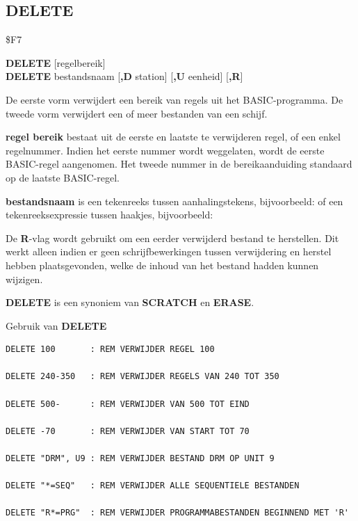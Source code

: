 \subsection{DELETE}
\begin{description}[leftmargin=2cm,style=nextline]
\item [Token:]   \$F7

\item [Formaat:]  {\bf DELETE} [regelbereik] \\                 {\bf DELETE} bestandsnaam [{\bf,D} station] [{\bf,U} eenheid] [{\bf,R}]

\item [Gebruik:]   De eerste vorm verwijdert een bereik van regels uit het BASIC-programma. De tweede vorm verwijdert een of meer bestanden van een schijf.

                 {\bf regel bereik} bestaat uit de eerste en laatste te verwijderen regel, of een enkel regelnummer. Indien het eerste nummer wordt weggelaten, wordt de eerste BASIC-regel aangenomen. Het tweede nummer in de bereikaanduiding standaard op de laatste BASIC-regel.

                 {\bf bestandsnaam} is een tekenreeks tussen aanhalingstekens, bijvoorbeeld:  of een tekenreeksexpressie tussen haakjes, bijvoorbeeld: 

                 \drivedefinition

                 \unitdefinition

                 De {\bf R}-vlag wordt gebruikt om een eerder verwijderd bestand te herstellen. Dit werkt alleen indien er geen schrijfbewerkingen tussen verwijdering en herstel hebben plaatsgevonden, welke de inhoud van het bestand hadden kunnen wijzigen.

\item [Opmerkingen:] {\bf DELETE} is een synoniem van {\bf SCRATCH} en {\bf ERASE}.

\item [Voorbeelden:] Gebruik van {\bf DELETE}

\begin{tcolorbox}[colback=black,coltext=white]
\verbatimfont{\codefont}
\begin{verbatim}
DELETE 100       : REM VERWIJDER REGEL 100

DELETE 240-350   : REM VERWIJDER REGELS VAN 240 TOT 350

DELETE 500-      : REM VERWIJDER VAN 500 TOT EIND

DELETE -70       : REM VERWIJDER VAN START TOT 70

DELETE "DRM", U9 : REM VERWIJDER BESTAND DRM OP UNIT 9

DELETE "*=SEQ"   : REM VERWIJDER ALLE SEQUENTIELE BESTANDEN

DELETE "R*=PRG"  : REM VERWIJDER PROGRAMMABESTANDEN BEGINNEND MET 'R'
\end{verbatim}
\end{tcolorbox}
\end{description}

